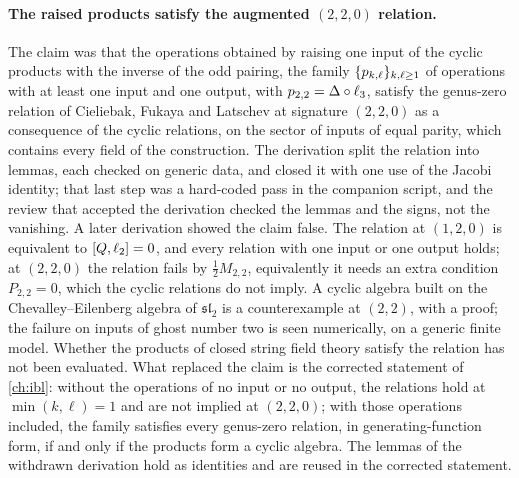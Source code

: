 \paragraph{The raised products satisfy the augmented \texorpdfstring{$(2, 2, 0)$}{(2,2,0)} relation.}
The claim was that the operations obtained by raising one input of the cyclic \Loo{} products with the inverse of the odd pairing, the family $\{p_{k,\ell}\}_{k, \ell \ge 1}$ of operations with at least one input and one output, with $p_{2,2} = \Delta \circ \ell_3$, satisfy the genus-zero relation of Cieliebak, Fukaya and Latschev at signature $(2, 2, 0)$ as a consequence of the cyclic \Loo{} relations, on the sector of inputs of equal parity, which contains every field of the construction.
The derivation split the relation into lemmas, each checked on generic data, and closed it with one use of the Jacobi identity; that last step was a hard-coded pass in the companion script, and the review that accepted the derivation checked the lemmas and the signs, not the vanishing.
A later derivation showed the claim false.
The relation at $(1, 2, 0)$ is equivalent to $[ Q, \ell_2 ] = 0$, and every relation with one input or one output holds; at $(2, 2, 0)$ the relation fails by $\tfrac{1}{2} M_{2, 2}$, equivalently it needs an extra condition $P_{2, 2} = 0$, which the cyclic \Loo{} relations do not imply.
A cyclic \Loo{} algebra built on the Chevalley--Eilenberg algebra of $\mathfrak{sl}_2$ is a counterexample at $(2, 2)$, with a proof; the failure on inputs of ghost number two is seen numerically, on a generic finite model.
Whether the products of closed string field theory satisfy the relation has not been evaluated.
What replaced the claim is the corrected statement of \cref{ch:ibl}: without the operations of no input or no output, the relations hold at $\min(k, \ell) = 1$ and are not implied at $(2, 2, 0)$; with those operations included, the family satisfies every genus-zero relation, in generating-function form, if and only if the products form a cyclic \Loo{} algebra.
The lemmas of the withdrawn derivation hold as identities and are reused in the corrected statement.

